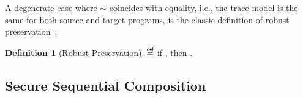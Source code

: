 \documentclass[dvipsnames,conference]{IEEEtran}
\theoremstyle{definition}
\newtheorem{definition}{Definition}[section]
\begin{document}
A degenerate case where $\sim$ coincides with equality, i.e., the trace model is the same for both source and target programs, is the classic definition of robust preservation~\cite{abate2019jour}:

\begin{definition}[Robust Preservation]\label{def:rtp}
  $\isdef$
   if \iul{$\rsat{\src{\progvar}}{\pi}$}, then .
\end{definition}

\subsection{Secure Sequential Composition}\label{sec:sequential}
\end{document}
